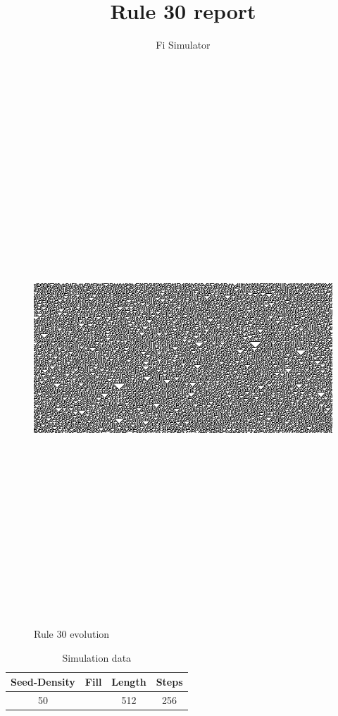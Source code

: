 \documentclass[12pt, letterpaper]{article}
\title{Rule 30 report}
\author{Fi Simulator}
\begin{document}
 
\begin{titlepage} 
\maketitle 
\tableofcontents 
\end{titlepage} 
\clearpage 
\begin{figure}[H]
	\centering
	\includegraphics[height=200mm, width=200mm, keepaspectratio]{simAnalysis.png} 
	\caption{Rule 30 evolution} 
\end{figure}
\begin{table}[H]
	\centering
	\begin{tabular}{|c|c|c|c| }
		\hline Seed-Density & Fill & Length & Steps \\ 
			\hline 50 &  & 512 & 256 \\ 
			\hline 
	\end{tabular} 
	\caption{Simulation data} 
\end{table} 
\end{document}

